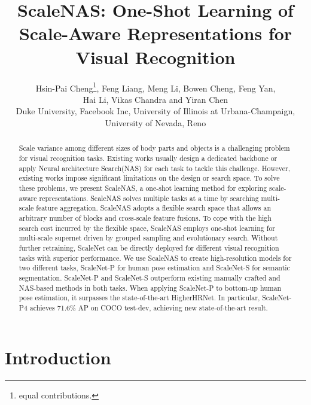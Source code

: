 \documentclass[final]{cvpr}
\newcommand{\workname}{ScaleNAS\xspace}
\newcommand{\netname}{ScaleNet\xspace}
\begin{document}
\title{\workname: One-Shot Learning of Scale-Aware Representations for \\ Visual Recognition}

\author{Hsin-Pai Cheng\thanks{equal contributions.}\xspace\xspace, 
Feng Liang\footnotemark[1]\xspace\xspace, Meng Li, Bowen Cheng, Feng Yan, \\
Hai Li, Vikas Chandra and Yiran Chen\\
Duke University, Facebook Inc, University of Illinois at Urbana-Champaign, 
University of Nevada, Reno\\
}

\maketitle


\begin{abstract}
Scale variance among different sizes of body parts and objects is a challenging problem for visual recognition tasks. 
Existing works usually design a dedicated backbone or apply Neural architecture Search(NAS) for each task to tackle this challenge.
However, existing works impose significant limitations on the design or search space.
To solve these problems, we present \workname, a one-shot learning method for exploring scale-aware representations. 
\workname solves multiple tasks at a time by searching multi-scale feature aggregation. 
\workname adopts a flexible search space that allows an arbitrary number of blocks and cross-scale feature fusions.
To cope with the high search cost incurred by the flexible space, \workname employs one-shot learning for multi-scale supernet driven by grouped sampling and evolutionary search. 
Without further retraining, \netname can be directly deployed for different visual recognition tasks with superior performance.
We use \workname to create high-resolution models for two different tasks,
\netname-P for human pose estimation and \netname-S for semantic segmentation. 
\netname-P and \netname-S outperform existing manually crafted and NAS-based methods in both tasks. 
When applying \netname-P to bottom-up human pose estimation, it surpasses the state-of-the-art HigherHRNet. In particular, \netname-P4 achieves 71.6\% AP on COCO test-dev, achieving new state-of-the-art result. 

\end{abstract}
\section{Introduction}
\end{document}
